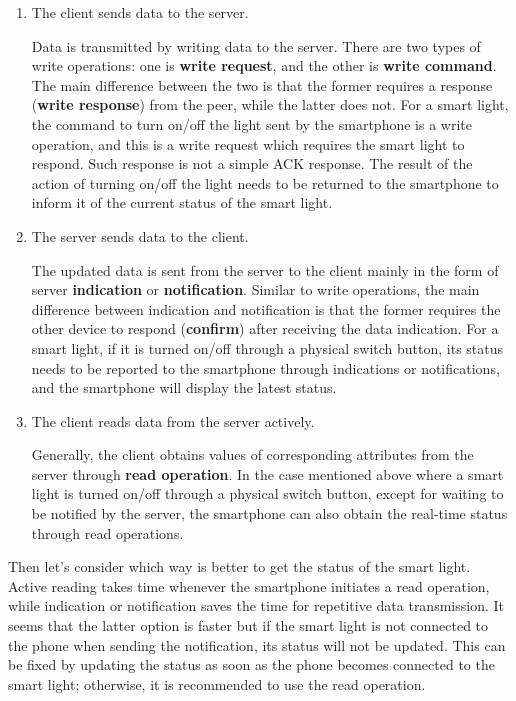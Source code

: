 \documentclass[a4paper,12pt]{book}
\begin{document}
\begin{enumerate}[label=(\arabic*)]
    \item The client sends data to the server.
    
    Data is transmitted by writing data to the server. There are two types of write operations: one is \textbf{write request}, and the other is \textbf{write command}. The main difference between the two is that the former requires a response (\textbf{write response}) from the peer, while the latter does not. For a smart light, the command to turn on/off the light sent by the smartphone is a write operation, and this is a write request which requires the smart light to respond. Such response is not a simple ACK response. The result of the action of turning on/off the light needs to be returned to the smartphone to inform it of the current status of the smart light.
    \item The server sends data to the client.
    
    The updated data is sent from the server to the client mainly in the form of server \textbf{indication} or \textbf{notification}. Similar to write operations, the main difference between indication and notification is that the former requires the other device to respond (\textbf{confirm}) after receiving the data indication. For a smart light, if it is turned on/off through a physical switch button, its status needs to be reported to the smartphone through indications or notifications, and the smartphone will display the latest status.
    \item The client reads data from the server actively.
    
    Generally, the client obtains values of corresponding attributes from the server through \textbf{read operation}. In the case mentioned above where a smart light is turned on/off through a physical switch button, except for waiting to be notified by the server, the smartphone can also obtain the real-time status through read operations.
\end{enumerate}

Then let’s consider which way is better to get the status of the smart light. Active reading takes time whenever the smartphone initiates a read operation, while indication or notification saves the time for repetitive data transmission. It seems that the latter option is faster but if the smart light is not connected to the phone when sending the notification, its status will not be updated. This can be fixed by updating the status as soon as the phone becomes connected to the smart light; otherwise, it is recommended to use the read operation.
\end{document}
